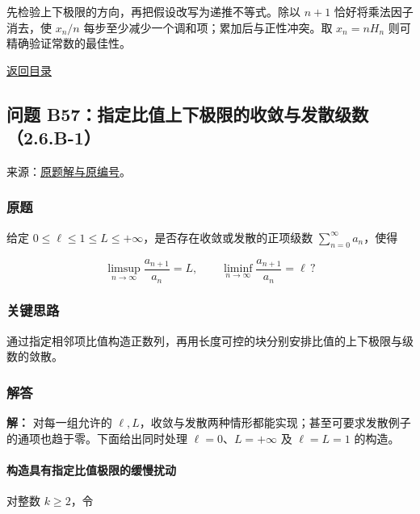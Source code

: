\documentclass[11pt,a4paper]{article}
\begin{document}
先检验上下极限的方向，再把假设改写为递推不等式。除以 \(n+1\)
恰好将乘法因子消去，使 \(x_n/n\)
每步至少减少一个调和项；累加后与正性冲突。取 \(x_n=nH_n\)
则可精确验证常数的最佳性。

\noindent\hyperref[contents]{返回目录}

\subsection{问题
B57：指定比值上下极限的收敛与发散级数（2.6.B-1）}\label{ux95eeux9898-b57ux6307ux5b9aux6bd4ux503cux4e0aux4e0bux6781ux9650ux7684ux6536ux655bux4e0eux53d1ux6563ux7ea7ux65702.6.b-1}

来源：\href{https://zj139.github.io/math-notes/problems/66783d8d0bfbf0815b31a433/\#问题-b57}{原题解与原编号}。

\subsubsection{原题}\label{ux539fux9898-24}

给定 \(0\le\ell\le1\le L\le+\infty\)，是否存在收敛或发散的正项级数
\(\sum_{n=0}^{\infty}a_n\)，使得

\[
\limsup_{n\to\infty}\frac{a_{n+1}}{a_n}=L,
\qquad
\liminf_{n\to\infty}\frac{a_{n+1}}{a_n}=\ell\,?
\]

\subsubsection{关键思路}\label{ux5173ux952eux601dux8def-24}

通过指定相邻项比值构造正数列，再用长度可控的块分别安排比值的上下极限与级数的敛散。

\subsubsection{解答}\label{ux89e3ux7b54-24}

\textbf{解：} 对每一组允许的
\(\ell,L\)，收敛与发散两种情形都能实现；甚至可要求发散例子的通项也趋于零。下面给出同时处理
\(\ell=0\)、\(L=+\infty\) 及 \(\ell=L=1\) 的构造。

\paragraph{构造具有指定比值极限的缓慢扰动}\label{ux6784ux9020ux5177ux6709ux6307ux5b9aux6bd4ux503cux6781ux9650ux7684ux7f13ux6162ux6270ux52a8}

对整数 \(k\ge2\)，令
\end{document}
